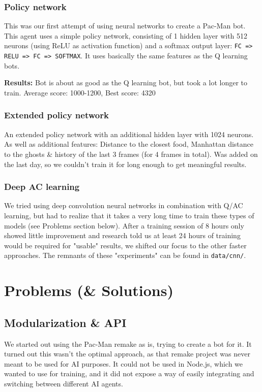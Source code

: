 \documentclass[10pt, letterpaper]{article}
\begin{document}
            \subsubsection*{Policy network}
                This was our first attempt of using neural networks to create a Pac-Man bot.
                This agent uses a simple policy network, consisting of 1 hidden layer with 512 neurons (using ReLU as activation function) and a softmax output layer: \texttt{FC => RELU => FC => SOFTMAX}. It uses basically the same features as the Q learning bots.
                
                \vspace{1em}\noindent
                \textbf{Results:} Bot is about as good as the Q learning bot, but took a lot longer to train. Average score: 1000-1200, Best score: 4320
                
                
            \subsubsection*{Extended policy network}
                An extended policy network with an additional hidden layer with 1024 neurons. As well as additional features: Distance to the closest food, Manhattan distance to the ghosts \& history of the last 3 frames (for 4 frames in total). Was added on the last day, so we couldn't train it for long enough to get meaningful results.
            
            \subsubsection*{Deep AC learning}
                We tried using deep convolution neural networks in combination with Q/AC learning, but had to realize that it takes a very long time to train these types of models (see Problems section below). After a training session of 8 hours only showed little improvement and research told us at least 24 hours of training would be required for "usable" results, we shifted our focus to the other faster approaches. The remnants of these "experiments" can be found in \texttt{data/cnn/}.
        
    \section{Problems (\& Solutions)}
        \subsection*{Modularization \& API}
            We started out using the Pac-Man remake as is, trying to create a bot for it. It turned out this wasn't the optimal approach, as that remake project was never meant to be used for AI purposes. It could not be used in Node.js, which we wanted to use for training, and it did not expose a way of easily integrating and switching between different AI agents.
            
\end{document}
